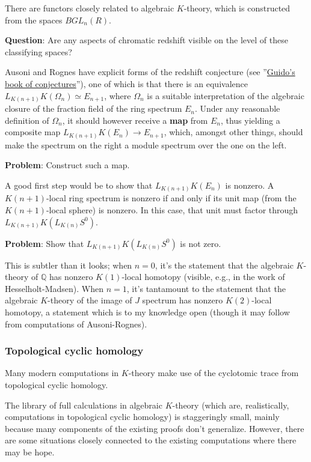 \documentclass[12pt,titlepage]{article}
\theoremstyle{plain}
\theoremstyle{definition}
\theoremstyle{remark}
\begin{document}
There are functors closely related to algebraic $K$-theory, which is constructed from the spaces $BGL_n(R)$.

\textbf{Question}: Are any aspects of chromatic redshift visible on the level of these classifying spaces?

Ausoni and Rognes have explicit forms of the redshift conjecture (see ''{}\href{http://www.math.univ-paris13.fr/~ausoni/papers/gmconj-AR.pdf}{Guido'{}s book of conjectures}''{}), one of which is that there is an equivalence $L_{K(n+1)} K(\Omega_n) \simeq E_{n+1}$, where $\Omega_n$ is a suitable interpretation of the algebraic closure of the fraction field of the ring spectrum $E_n$. Under any reasonable definition of $\Omega_n$, it should however receive a \textbf{map} from $E_n$, thus yielding a composite map $L_{K(n+1)} K(E_n) \to E_{n+1}$, which, amongst other things, should make the spectrum on the right a module spectrum over the one on the left.

\textbf{Problem}: Construct such a map.

A good first step would be to show that $L_{K(n+1)} K(E_n)$ is nonzero. A $K(n+1)$-local ring spectrum is nonzero if and only if its unit map (from the $K(n+1)$-local sphere) is nonzero. In this case, that unit must factor through $L_{K(n+1)} K(L_{K(n)} S^0)$.

\textbf{Problem}: Show that $L_{K(n+1)} K(L_{K(n)} S^0)$ is not zero.

This is subtler than it looks; when $n=0$, it'{}s the statement that the algebraic $K$-theory of $\mathbb{Q}$ has nonzero $K(1)$-local homotopy (visible, e.g., in the work of Hesselholt-Madsen). When $n=1$, it'{}s tantamount to the statement that the algebraic $K$-theory of the image of $J$ spectrum has nonzero $K(2)$-local homotopy, a statement which is to my knowledge open (though it may follow from computations of Ausoni-Rognes).

\hypertarget{topological_cyclic_homology_3}{}\subsubsection{{Topological cyclic homology}}\label{topological_cyclic_homology_3}

Many modern computations in $K$-theory make use of the cyclotomic trace from topological cyclic homology.

The library of full calculations in algebraic $K$-theory (which are, realistically, computations in topological cyclic homology) is staggeringly small, mainly because many components of the existing proofs don'{}t generalize. However, there are some situations closely connected to the existing computations where there may be hope.
\end{document}
